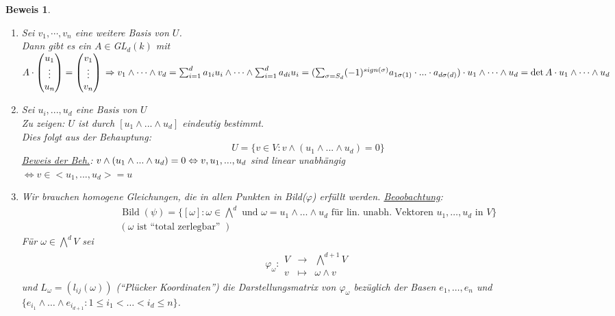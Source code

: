\documentclass[a4paper,12pt]{report}
\theoremstyle{break}
\theoremstyle{nonumberbreak}
\theoremstyle{nonumberplain}
\newtheorem{Bew}{Beweis}
\newcommand{\Abb}[5]{\ensuremath{#1:\begin{array}{ccc} #2 & \longrightarrow & #3 \\ #4 & \longmapsto & #5 \end{array}}}
\DeclareMathOperator{\Bild}{Bild}
\begin{document}
\begin{Bew}
\begin{enumerate}
\item Sei $v_1,\cdots,v_n$ eine weitere Basis von $U$.\\
Dann gibt es ein $A\in$GL$_d(k)$ mit 
$A\cdot\begin{pmatrix}
u_1\\
\vdots\\
u_n
\end{pmatrix}=
\begin{pmatrix}
v_1\\
\vdots\\
v_n
\end{pmatrix}\\
\Rightarrow v_1\wedge\cdots\wedge v_d=\sum_{i=1}^da_{1i}u_i\wedge\cdots\wedge\sum_{i=1}^da_{di}u_i=\\
(\sum_{\sigma=S_d}(-1)^{sign(\sigma)}a_{1\sigma(1)}\cdot...\cdot a_{d\sigma(d)})\cdot u_1\wedge\cdots\wedge u_d=\det A\cdot u_1\wedge\cdots\wedge u_d$
\item Sei $u_i,...,u_d$ eine Basis von $U$\\
Zu zeigen: $U$ ist durch $[u_1\wedge...\wedge u_d]$ eindeutig bestimmt.\\
Dies folgt aus der Behauptung:
$$U=\{v\in V: v\wedge(u_1\wedge...\wedge u_d)=0\}$$
\underline{Beweis der Beh.}: $v\wedge(u_1\wedge...\wedge u_d)=0\\
\Leftrightarrow v,u_1,...,u_d$ sind linear unabhängig\\
$\Leftrightarrow v\in <u_1,...,u_d>=u$
\item Wir brauchen homogene Gleichungen, die in allen Punkten in Bild($\varphi$) erfüllt werden.
\underline{Beoobachtung}:
  \begin{align*}
  \Bild(\psi)=\{[\omega]:\omega\in\bigwedge^d\text{ und } \omega=u_1\wedge\dots\wedge u_d
  \text{ für lin. unabh. Vektoren } u_1,\dots, u_d\text{ in } V\} \\
    (\omega \text{ ist ``total zerlegbar'' })
  \end{align*}
  Für $\omega\in \bigwedge^d V$ sei
  \begin{align*}
    \Abb{\varphi_\omega}{V}{\bigwedge^{d+1}V}{v}{\omega\wedge v}
  \end{align*}
  und $L_\omega=(l_{ij}(\omega))$ (``Plücker Koordinaten'') die Darstellungsmatrix von
  $\varphi_\omega$ bezüglich der Basen $e_1,\dots,e_n$ und $\{e_{i_1}\wedge\dots\wedge e_{i_{d+1}}:1\leq i_1<\dots <i_d\leq n\}$.\\

\end{enumerate}
\end{Bew}
\end{document}
